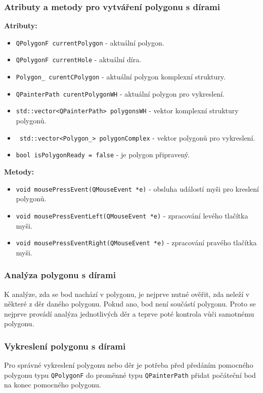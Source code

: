 \subsubsection{Atributy a metody pro vytváření polygonu s dírami}
\textbf{Atributy:}
\begin{itemize}
    \item \texttt{QPolygonF currentPolygon} - aktuální polygon.
    \item \texttt{QPolygonF currentHole} - aktuální díra.
    \item \texttt{Polygon\_ curentCPolygon} - aktuální polygon komplexní struktury.
    \item \texttt{QPainterPath curentPolygonWH} - aktuální polygon pro vykreslení.
    \item \texttt{std::vector<QPainterPath> polygonsWH} - vektor komplexní struktury polygonů.
    \item \texttt{ std::vector<Polygon\_> polygonComplex} - vektor polygonů pro vykreslení.
    \item \texttt{bool isPolygonReady = false} - je polygon připravený.
\end{itemize}
\textbf{Metody:}
\begin{itemize}
    \item \texttt{void mousePressEvent(QMouseEvent *e)} - obsluha událostí myši pro kreslení polygonů.
    \item \texttt{void mousePressEventLeft(QMouseEvent *e)} - zpracování levého tlačítka myši.
    \item \texttt{void mousePressEventRight(QMouseEvent *e)} - zpracování pravého tlačítka myši.
\end{itemize}


\newpage
\subsubsection{Analýza polygonu s dírami}
K analýze, zda se bod nachází v polygonu, je nejprve nutné ověřit, zda neleží v některé z děr daného polygonu. Pokud ano, bod není součástí polygonu. Proto se nejprve provádí analýza jednotlivých děr a teprve poté kontrola vůči samotnému polygonu.


\subsubsection{Vykreslení polygonu s dírami}
Pro správné vykreslení polygonu nebo děr je potřeba před předáním pomocného polygonu typu \texttt{QPolygonF} do proměnné typu \texttt{QPainterPath} přidat počáteční bod na konec pomocného polygonu.

